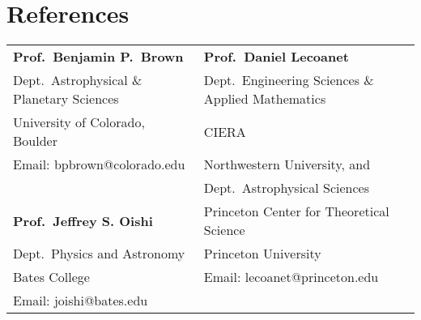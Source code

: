 \section{References}

\begin{tabular}{ll}
\textbf{Prof.~Benjamin P.~Brown} 					&\hspace{0.5in} \textbf{Prof.~Daniel Lecoanet}  					\\
Dept.~Astrophysical \& Planetary Sciences			&\hspace{0.5in} Dept.~Engineering Sciences \& Applied Mathematics 	\\
University of Colorado, Boulder  					&\hspace{0.5in} CIERA 												\\
Email: bpbrown@colorado.edu							&\hspace{0.5in} Northwestern University, and 						\\
													&\hspace{0.5in} Dept.~Astrophysical Sciences 						\\
\textbf{Prof.~Jeffrey S. Oishi}						&\hspace{0.5in} Princeton Center for Theoretical Science 			\\
Dept.~Physics and Astronomy							&\hspace{0.5in} Princeton University 								\\
Bates College				 						&\hspace{0.5in} Email: lecoanet@princeton.edu						\\
Email: joishi@bates.edu 				\\
     \end{tabular}

